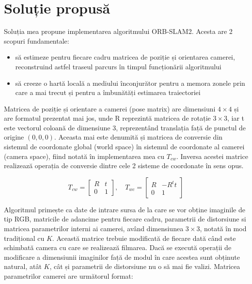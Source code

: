 \documentclass[12pt,a4paper]{report}
\begin{document}
\chapter{Soluție propusă}
Soluția mea propune implementarea algoritmului ORB-SLAM2. Acesta are 2 scopuri 
fundamentale:
\begin{itemize}
    \item să estimeze pentru fiecare cadru matricea de poziție și orientarea
     camerei, reconstruind astfel traseul parcurs în timpul funcționării algoritmului  
    \item să creeze o hartă locală a mediului înconjurător pentru a memora zonele
prin care a mai trecut și pentru a îmbunătăți estimarea traiectoriei  
\end{itemize}
Matricea de poziție și orientare a camerei (pose matrix) are dimensiuni $ 4 \times 4 $ și are 
formatul prezentat mai jos, unde R reprezintă matricea de rotație $ 3 \times 3 $, iar t este
vectorul coloană de dimensiune 3, reprezentând translația față de punctul de origine
\( (0, 0, 0)\). Aceasta mai este denumită și matricea de conversie din sistemul de 
coordonate global (world space) în sistemul de coordonate al camerei (camera space), fiind
 notată în implementarea mea cu \( T_{cw} \). Inversa acestei matrice
  realizează operația de conversie dintre cele 2 sisteme de coordonate 
în sens opus.

\begin{equation}
T_{cw} = 
\begin{bmatrix}
R & t \\
0 & 1
\end{bmatrix}, \quad{}
T_{wc} = 
\begin{bmatrix}
R & -R^{t}t \\
0 & 1
\end{bmatrix}
\end{equation}

Algoritmul primește ca date de intrare sursa de la care se vor obține imaginile de tip
RGB, matricile de adancime pentru fiecare cadru, parametrii de distorsiune si matricea parametrilor interni ai camerei, 
având dimensiunea $ 3 \times 3 $, notată în mod tradițional cu \(K\). Această matrice trebuie modificată de 
fiecare dată când este schimbată camera cu care se realizează filmarea. Dacă se execută operații de modificare
a dimensiunii imaginilor față de modul în care acestea sunt obținute natural, atât \( K \), cât și parametrii
de distorsiune nu o să mai fie valizi. Matricea parametrilor camerei are următorul format:
\end{document}
